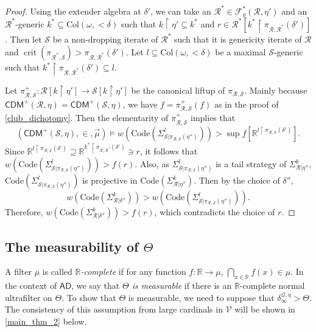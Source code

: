 \documentclass{amsart}
\renewcommand{\subset}{\subseteq}
\newcommand{\uphar}{\mathbin{\upharpoonright}}
\DeclareMathOperator{\crit}{crit}
\begin{document}
\begin{proof}
Using the extender algebra at $\delta'$, we can take an $\mathcal{R}^*\in\mathcal{F}^*_g(\mathcal{R}, \eta')$ and an $\mathcal{R}^*$-generic $k^*\subset\mathrm{Col}(\omega, {<}\delta)$ such that $k\uphar\eta'\subset k^*$ and $r\in\mathcal{R}^*[k^*\uphar\pi_{\mathcal{R},\mathcal{R}^*}(\delta')]$.
Then let $\mathcal{S}$ be a non-dropping iterate of $\mathcal{R}^*$ such that it is genericity iterate of $\mathcal{R}$ and $\crit(\pi_{\mathcal{R}^*, \mathcal{S}})>\pi_{\mathcal{R},\mathcal{R}^*}(\delta')$.
Let $l\subset\mathrm{Col}(\omega, {<}\delta)$ be a maximal $\mathcal{S}$-generic such that $k^*\uphar\pi_{\mathcal{R}, \mathcal{R}^*}(\delta')\subset l$.

Let $\pi^{+}_{\mathcal{R}, \mathcal{S}}\colon\mathcal{R}[k\uphar\eta']\to\mathcal{S}[k\uphar\eta']$ be the canonical liftup of $\pi_{\mathcal{R}, \mathcal{S}}$.
Mainly because $\mathsf{CDM}^+(\mathcal{R}, \eta)=\mathsf{CDM}^+(\mathcal{S}, \eta)$, we have $f = \pi^+_{\mathcal{R}, \mathcal{S}}(f)$ as in the proof of \cref{club_dichotomy}.
Then the elementarity of $\pi^+_{\mathcal{R}, \mathcal{S}}$ implies that
\[
(\mathsf{CDM}^+(\mathcal{S}, \eta), {\in}, \vec{\mu})\models w(\mathrm{Code}(\Sigma^l_{\mathcal{S}\vert\pi_{\mathcal{R}, \mathcal{S}}(\eta'')}))>\sup f[\mathbb{R}^{l\uphar\pi_{\mathcal{R}, \mathcal{S}}(\delta')}].
\]
Since $\mathbb{R}^{l\uphar\pi_{\mathcal{R, \mathcal{S}}}(\delta')}\supseteq\mathbb{R}^{k^*\uphar\pi_{\mathcal{R}, \mathcal{R}^*}(\delta')}\ni r$, it follows that $w(\mathrm{Code}(\Sigma^l_{\mathcal{S}\vert\pi_{\mathcal{R}, \mathcal{S}}(\eta'')}))>f(r)$.
Also, as $\Sigma^l_{\mathcal{S}\vert\pi_{\mathcal{R}, \mathcal{S}}(\eta'')}$ is a tail strategy of $\Sigma^k_{\mathcal{R}\vert\eta''}$, $\mathrm{Code}(\Sigma^l_{\mathcal{S}\vert\pi_{\mathcal{R}, \mathcal{S}}(\eta'')})$ is projective in $\mathrm{Code}(\Sigma^k_{\mathcal{R}\vert\eta''})$.
Then by the choice of $\delta''$,
\[
w(\mathrm{Code}(\Sigma^k_{\mathcal{R}\vert\delta''}))> w(\mathrm{Code}(\Sigma^l_{\mathcal{S}\vert\pi_{\mathcal{R}, \mathcal{S}}(\eta'')})).
\]
Therefore, $w(\mathrm{Code}(\Sigma^k_{\mathcal{R}\vert\delta''}))>f(r)$, which contradicts the choice of $r$.
\end{proof}

\subsection{The measurability of $\Theta$}

A filter $\mu$ is called \emph{$\mathbb{R}$-complete} if for any function $f\colon\mathbb{R}\to\mu$, $\bigcap_{x\in\mathbb{R}}f(x)\in\mu$.
In the context of $\mathsf{AD}$, we say that \emph{$\Theta$ is measurable} if there is an $\mathbb{R}$-complete normal ultrafilter on $\Theta$.
To show that $\Theta$ is measurable, we need to suppose that $\delta^{\mathcal{Q}, \eta}_{\infty}>\Theta$.
The consistency of this assumption from large cardinals in $\mathcal{V}$ will be shown in \cref{main_thm_2} below.
\end{document}

